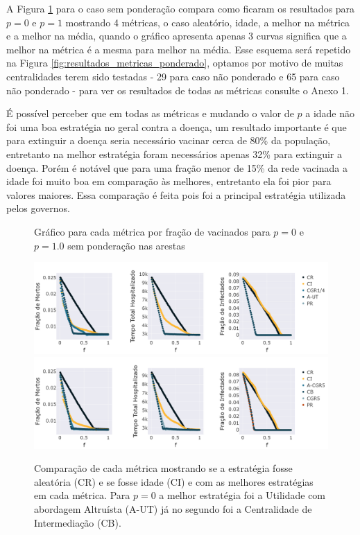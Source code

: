 A Figura \ref{fig:resultados_metricas} para o caso sem ponderação compara como ficaram os resultados para $p = 0$ e $p = 1$ mostrando 4 métricas, o caso aleatório, idade, a melhor na métrica e a melhor na média, quando o gráfico apresenta apenas 3 curvas significa que a melhor na métrica é a mesma para melhor na média. Esse esquema será repetido na Figura \ref{fig:resultados_metricas_ponderado}, optamos por motivo de muitas centralidades terem sido testadas - 29 para caso não ponderado e 65 para caso não ponderado - para ver os resultados de todas as métricas consulte o Anexo 1.

É possível perceber que em todas as métricas e mudando o valor de $p$ a idade não foi uma boa estratégia no geral contra a doença, um resultado importante é que para extinguir a doença seria necessário vacinar cerca de 80\% da população, entretanto na melhor estratégia foram necessários apenas 32\% para extinguir a doença. Porém é notável que para uma fração menor de 15\% da rede vacinada a idade foi muito boa em comparação às melhores, entretanto ela foi pior para valores maiores. Essa comparação é feita pois foi a principal estratégia utilizada pelos governos.

\begin{figure}[H]
    \centering
    \captionsetup{font=normalsize,skip=0.8pt,singlelinecheck=on,labelsep=endash}
    \caption{Gráfico para cada métrica por fração de vacinados para $p = 0$ e $p = 1.0$ sem ponderação nas arestas}
    \includegraphics[scale= 0.3]{figuras/compara_p_f_nponderado_0.0.png}
    \includegraphics[scale= 0.3]{figuras/compara_p_f_nponderado_1.0.png}
    \captionsetup{font=small,justification=justified}
    
    \caption*{Comparação de cada métrica mostrando se a estratégia fosse aleatória (CR) e se fosse idade (CI) e com as melhores estratégias em cada métrica. Para $p = 0$ a melhor estratégia foi a Utilidade com abordagem Altruísta (A-UT) já no segundo foi a Centralidade de Intermediação (CB). }
    \label{fig:resultados_metricas}
\end{figure}

